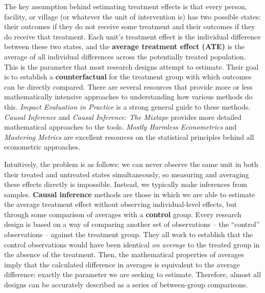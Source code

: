 The key assumption behind estimating treatment effects is that every
person, facility, or village (or whatever the unit of intervention is)
has two possible states: their outcomes if they do not receive some treatment
and their outcomes if they do receive that treatment.
Each unit's treatment effect is the individual difference between these two states,
and the \textbf{average treatment effect (ATE)} is the average of all
individual differences across the potentially treated population.
This is the parameter that most research designs attempt to estimate.
Their goal is to establish a \textbf{counterfactual}
for the treatment group with which outcomes can be directly compared.
There are several resources that provide more or less mathematically intensive
approaches to understanding how various methods do this.
\textit{Impact Evaluation in Practice} is a strong general guide to these methods.
\textit{Causal Inference} and \textit{Causal Inference: The Mixtape}
provides more detailed mathematical approaches to the tools.
\textit{Mostly Harmless Econometrics} and \textit{Mastering Metrics}
are excellent resources on the statistical principles behind all econometric approaches.

Intuitively, the problem is as follows: we can never observe the same unit
in both their treated and untreated states simultaneously,
so measuring and averaging these effects directly is impossible.
Instead, we typically make inferences from samples.
\textbf{Causal inference} methods are those in which we are able to estimate the
average treatment effect without observing individual-level effects,
but through some comparison of averages with a \textbf{control} group.
Every research design is based on a way of comparing another set of observations --
the ``control'' observations -- against the treatment group.
They all work to establish that the control observations would have been
identical \textit{on average} to the treated group in the absence of the treatment.
Then, the mathematical properties of averages imply that the calculated
difference in averages is equivalent to the average difference:
exactly the parameter we are seeking to estimate.
Therefore, almost all designs can be accurately described
as a series of between-group comparisons.


